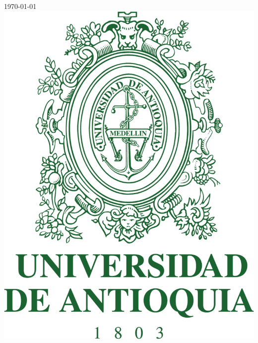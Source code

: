 \documentclass[12pt]{article}
\begin{document}
\begin{titlepage}


{\large \today}\\[2cm] %


\includegraphics[scale=0.09]{udea_logo4.png}\\[1cm] %
 

\vfill %

\end{titlepage}
\end{document}
